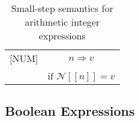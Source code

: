\begin{table}[H]
    \centering
    \begin{longtable}[c] { r c }
        
        [NUM] & \( n \Rightarrow v \) 
         \\ \\
        & 
       \( \text{if } \mathcal{N} [[n]] = v \) \\
        
    \end{longtable}
    \caption{Small-step semantics for arithmetic integer expressions}
\end{table}

\subsection{Boolean Expressions}
